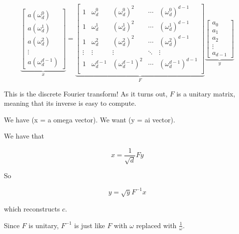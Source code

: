 \documentclass[12pt]{article}
\begin{document}
\begin{enumerate}
      \[
        \underbrace {
          \begin{bmatrix}
            a(\omega_d^0) \\
            a(\omega_d^1) \\
            a(\omega_d^2) \\
            \vdots \\
            a(\omega_d^{d - 1})
          \end{bmatrix}
        }_{x}
        =
        \underbrace{
          \begin{bmatrix}
            1 & \omega_d^0 & \left( \omega_d^0 \right)^2 & \cdots & \left( \omega_d^0 \right)^{d - 1} \\
            1 & \omega_d^1 & \left( \omega_d^1 \right)^2 & \cdots & \left( \omega_d^1 \right)^{d - 1} \\
            1 & \omega_d^2 & \left( \omega_d^2 \right)^2 & \cdots & \left( \omega_d^2 \right)^{d - 1} \\
            \vdots & \vdots & \vdots & \ddots & \vdots \\
            1 & \omega_d^{d - 1} & \left( \omega_d^{d - 1} \right)^2 & \cdots & \left( \omega_d^{d - 1} \right)^{d - 1} \\
          \end{bmatrix}
        }_{F}
        \underbrace{
          \begin{bmatrix}
            a_0 \\
            a_1 \\
            a_2 \\
            \vdots \\
            a_{d - 1}
          \end{bmatrix}
        }_{y}
      \]

      This is the discrete Fourier transform! As it turns out, $F$ is a unitary
      matrix, meaning that its inverse is easy to compute.

      We have (x = a omega vector). We want (y = ai vector). 

      We have that

      \[
        x = \frac{1}{\sqrt{d}} F y
      \]

      So

      \[
        y = \sqrt{y} F^{-1} x
      \]

      which reconstructs $c$.

      Since $F$ is unitary, $F^{-1}$ is just like $F$ with $\omega$ replaced
      with $\frac{1}{\omega}$.

  \end{enumerate}
\end{document}
